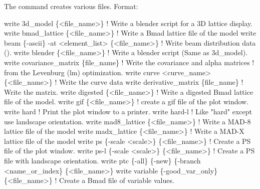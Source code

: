 {{{The  command creates various files.
Format:
\begin{example}
  write 3d_model \{<file_name>\}           ! Write a blender script for a 3D lattice display.
  write bmad_lattice \{<file_name>\}       ! Write a Bmad lattice file of the model
  write beam \{-ascii\} -at <element_list> \{<file_name>\} 
                                         ! Write beam distribution data ().
  write blender \{<file_name>\}            ! Write a blender script (Same as 3d_model).
  write covariance_matrix \{file_name\}    ! Write the covariance and alpha matrices 
                                         !   from the Levenburg (lm) optimization.
  write curve <curve_name> \{<file_name>\} ! Write the curve data
  write derivative_matrix \{file_name\}    ! Write the  matrix.
  write digested \{<file_name>\}     ! Write a digested Bmad lattice file of the model.
  write gif \{<file_name>\}          ! create a gif file of the plot window.
  write hard                       ! Print the plot window to a printer.
  write hard-l                     ! Like "hard" except use landscape orientation. 
  write mad8_lattice \{<file_name>\} ! Write a MAD-8 lattice file of the model
  write madx_lattice \{<file_name>\} ! Write a MAD-X lattice file of the model
  write ps \{-scale <scale>\} \{<file_name>\}      
                                   ! Create a PS file of the plot window.
  write ps-l \{-scale <scale>\} \{<file_name>\}    
                                   ! Create a PS file with landscape orientation.
  write ptc \{-all\} \{-new\} \{-branch <name_or_index\} \{<file_name>\}
  write variable \{-good_var_only\} \{<file_name>\} 
                                   ! Create a Bmad file of variable values.
\end{example}

\vskip 0.2in 

}}}
